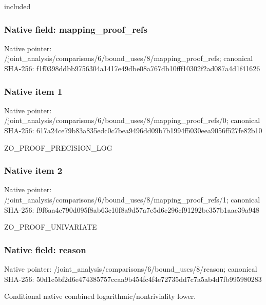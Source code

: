 \documentclass[10pt,a4paper]{article}
\begin{document}
\begingroup\raggedright\sloppy included\par\endgroup

\subsubsection{Native field: mapping\_\allowbreak{}proof\_\allowbreak{}refs}
Native pointer: /joint\_\allowbreak{}analysis/comparisons/6/bound\_\allowbreak{}uses/8/mapping\_\allowbreak{}proof\_\allowbreak{}refs; canonical SHA-256: f1f0398ddbb9756304a1417e49dbe08a767db10fff10302f2ad087a4d1f41626

\subsubsection{Native item 1}
Native pointer: /joint\_\allowbreak{}analysis/comparisons/6/bound\_\allowbreak{}uses/8/mapping\_\allowbreak{}proof\_\allowbreak{}refs/0; canonical SHA-256: 617a24ce79b83a835edc0c7bea9496dd09b7b1994f5030eea9056f527fe82b10

\begingroup\raggedright\sloppy ZO\_\allowbreak{}PROOF\_\allowbreak{}PRECISION\_\allowbreak{}LOG\par\endgroup

\subsubsection{Native item 2}
Native pointer: /joint\_\allowbreak{}analysis/comparisons/6/bound\_\allowbreak{}uses/8/mapping\_\allowbreak{}proof\_\allowbreak{}refs/1; canonical SHA-256: f9f6aa4c790d095f8ab63c10f8a9d57a7e5d6c296cf91292be357b1aac39a948

\begingroup\raggedright\sloppy ZO\_\allowbreak{}PROOF\_\allowbreak{}UNIVARIATE\par\endgroup

\subsubsection{Native field: reason}
Native pointer: /joint\_\allowbreak{}analysis/comparisons/6/bound\_\allowbreak{}uses/8/reason; canonical SHA-256: 50d1c5bf2d6e474385757ccaa9b454fc4f4e72735dd7c7a5ab4d7fb995980283

\begingroup\raggedright\sloppy Conditional native combined logarithmic/\allowbreak{}nontriviality lower.\par\endgroup
\end{document}
